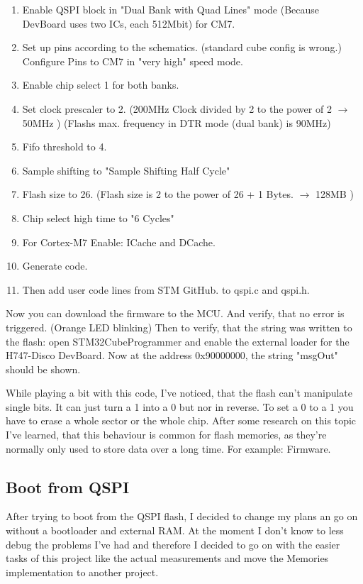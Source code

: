 \begin{enumerate}
	\item Enable QSPI block in "Dual Bank with Quad Lines" mode (Because DevBoard uses two ICs, each 512Mbit) for CM7.
	\item Set up pins according to the schematics. (standard cube config is wrong.) Configure Pins to CM7 in "very high" speed mode.
	\item Enable chip select 1 for both banks.
	\item Set clock prescaler to 2. (200MHz Clock divided by 2 to the power of 2 \(\rightarrow\) 50MHz ) (Flashs max. frequency in DTR mode (dual bank) is 90MHz)
	\item Fifo threshold to 4.
	\item Sample shifting to "Sample Shifting Half Cycle"
	\item Flash size to 26. (Flash size is 2 to the power of 26 + 1 Bytes. \(\rightarrow\) 128MB )
	\item Chip select high time to "6 Cycles"
	\item For Cortex-M7 Enable: ICache and DCache.
	\item Generate code.
	\item Then add user code lines from STM GitHub. \cite{GIT_DRIVER_QSPI_FLASH} to qspi.c and qspi.h.
\end{enumerate}

Now you can download the firmware to the MCU. And verify, that no error is triggered. (Orange LED blinking) Then to verify, that the string was written to the flash: open STM32CubeProgrammer and enable the external loader for the H747-Disco DevBoard. Now at the address 0x90000000, the string "msgOut" should be shown.

\begin{codeblock}
	
\end{codeblock}

While playing a bit with this code, I've noticed, that the flash can't manipulate single bits. It can just turn a 1 into a 0 but nor in reverse. To set a 0 to a 1 you have to erase a whole sector or the whole chip. After some research on this topic I've learned, that this behaviour is common for flash memories, as they're normally only used to store data over a long time. For example: Firmware.


\subsection{Boot from QSPI}
After trying to boot from the QSPI flash, I decided to change my plans an go on without a bootloader and external RAM. At the moment I don't know to less debug the problems I've had and therefore I decided to go on with the easier tasks of this project like the actual measurements and move the Memories implementation to another project.